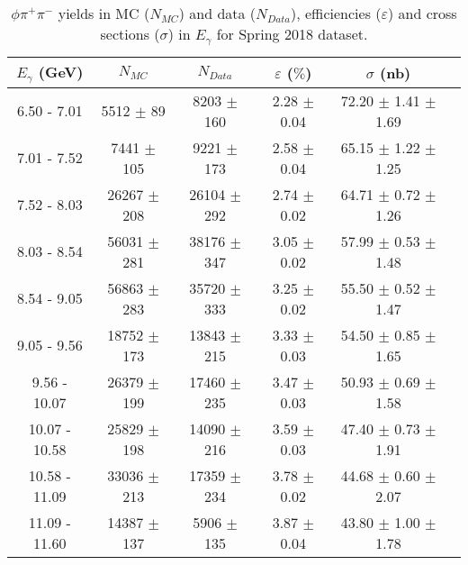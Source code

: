 \begin{center}
\begin{table}[H]
    \caption{$\phi \pi^{+}\pi^{-}$ yields in MC ($N_{MC}$) and data ($N_{Data}$), efficiencies ($\varepsilon$) and cross sections ($\sigma$) in $E_{\gamma}$ for Spring 2018 dataset.}
    \label{tab.y2175.xsec_ul.phi2pi.3.1}
    \begin{tabular}{|c|c|c|c|c|c|}
    \hline
    $E_{\gamma}$ (GeV) & $N_{MC}$ & $N_{Data}$ & $\varepsilon$ ($\%$) & $\sigma$ (nb) \\ 
    \hline
    6.50 - 7.01 & 5512 $\pm$ 89 & 8203 $\pm$ 160 & 2.28 $\pm$ 0.04 & 72.20 $\pm$ 1.41 $\pm$ 1.69 \\ 
    7.01 - 7.52 & 7441 $\pm$ 105 & 9221 $\pm$ 173 & 2.58 $\pm$ 0.04 & 65.15 $\pm$ 1.22 $\pm$ 1.25 \\ 
    7.52 - 8.03 & 26267 $\pm$ 208 & 26104 $\pm$ 292 & 2.74 $\pm$ 0.02 & 64.71 $\pm$ 0.72 $\pm$ 1.26 \\ 
    8.03 - 8.54 & 56031 $\pm$ 281 & 38176 $\pm$ 347 & 3.05 $\pm$ 0.02 & 57.99 $\pm$ 0.53 $\pm$ 1.48 \\ 
    8.54 - 9.05 & 56863 $\pm$ 283 & 35720 $\pm$ 333 & 3.25 $\pm$ 0.02 & 55.50 $\pm$ 0.52 $\pm$ 1.47 \\ 
    9.05 - 9.56 & 18752 $\pm$ 173 & 13843 $\pm$ 215 & 3.33 $\pm$ 0.03 & 54.50 $\pm$ 0.85 $\pm$ 1.65 \\ 
    9.56 - 10.07 & 26379 $\pm$ 199 & 17460 $\pm$ 235 & 3.47 $\pm$ 0.03 & 50.93 $\pm$ 0.69 $\pm$ 1.58 \\ 
    10.07 - 10.58 & 25829 $\pm$ 198 & 14090 $\pm$ 216 & 3.59 $\pm$ 0.03 & 47.40 $\pm$ 0.73 $\pm$ 1.91 \\ 
    10.58 - 11.09 & 33036 $\pm$ 213 & 17359 $\pm$ 234 & 3.78 $\pm$ 0.02 & 44.68 $\pm$ 0.60 $\pm$ 2.07 \\ 
    11.09 - 11.60 & 14387 $\pm$ 137 & 5906 $\pm$ 135 & 3.87 $\pm$ 0.04 & 43.80 $\pm$ 1.00 $\pm$ 1.78 \\
   \hline
\end{tabular}
\end{table}
\null
\vfill
\end{center}

